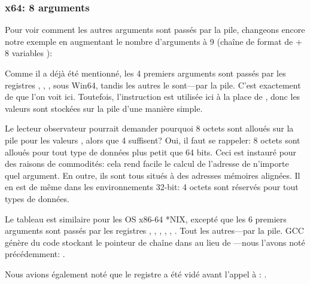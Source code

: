 \subsubsection{x64: 8 arguments}

\label{example_printf8_x64}
Pour voir comment les autres arguments sont passés par la pile, changeons encore
notre exemple en augmentant le nombre d'arguments à 9 (chaîne de format de
\printf + 8 variables \Tint):




Comme il a déjà été mentionné, les 4 premiers arguments sont passés par les registres
\RCX, \RDX, ,  sous Win64, tandis les autres le sont---par la pile.
C'est exactement de que l'on voit ici.
Toutefois, l'instruction \MOV est utilisée ici à la place de \PUSH, donc les valeurs
sont stockées sur la pile d'une manière simple.



Le lecteur observateur pourrait demander pourquoi 8 octets sont alloués sur la
pile pour les valeurs \Tint, alors que 4 suffisent?
Oui, il faut se rappeler: 8 octets sont alloués pour tout type de données plus
petit que 64 bits.
Ceci est instauré pour des raisons de commodités: cela rend facile le calcul
de l'adresse de n'importe quel argument.
En outre, ils sont tous situés à des adresses mémoires alignées.
Il en est de même dans les environnements 32-bit: 4 octets sont réservés pour tout
types de données.



Le tableau est similaire pour les OS x86-64 *NIX, excepté que les 6 premiers arguments
sont passés par les registres \RDI, \RSI, \RDX, \RCX, , .
Tout les autres---par la pile.
GCC génère du code stockant le pointeur de chaîne dans \EDI au lieu de \RDI{}---nous
l'avons noté précédemment:
.

Nous avions également noté que le registre \EAX a été vidé avant l'appel à
\printf: .

